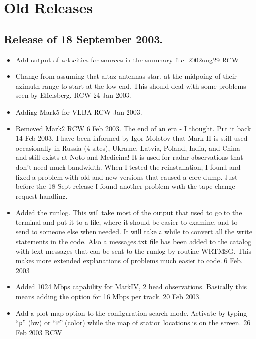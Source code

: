 \documentclass{report}
\begin{document}
\section{\label{SSEC:OLDRELEASE}Old Releases}


\subsection{\label{SSSEC:18SEP2003}Release of 18 September 2003.}

\begin{itemize}

\item  Add output of velocities for sources in the summary file.
2002aug29 RCW.

\item  Change from assuming that altaz antennas start at the midpoing
of their azimuth range to start at the low end.  This should deal
with some problems seen by Effelsberg.  RCW  24 Jan 2003.

\item  Adding Mark5 for VLBA  RCW Jan 2003.

\item Removed Mark2 RCW 6 Feb 2003.  The end of an era - I thought.
Put it back 14 Feb 2003.  I have been informed by Igor Molotov that
Mark II is still used occasionally in Russia (4 sites), Ukraine,
Latvia, Poland, India, and China and still exists at Noto and
Medicina!  It is used for radar observations that don't need much
bandwidth.  When I tested the reinstallation, I found and fixed a
problem with old and new versions that caused a core dump.
Just before the 18 Sept release I found another problem with the
tape change request handling.

\item  Added the runlog.  This will take most of the output that used
to go to the terminal and put it to a file, where it should be easier
to examine, and to send to someone else when needed.  It will take
a while to convert all the write statements in the code.  Also a
messages.txt file has been added to the catalog with text messages
that can be sent to the runlog by routine WRTMSG.  This makes more
extended explanations of problems much easier to code.  6 Feb. 2003

\item  Added 1024 Mbps capability for MarkIV, 2 head observations.
Basically this means adding the option for 16 Mbps per track.
20 Feb 2003.

\item  Add a plot map option to the configuration search mode.  Activate
by typing ``{\tt p}'' (bw) or ``{\tt P}'' (color) while the map
of station locations is on the screen.  26 Feb 2003  RCW


\end{itemize}
\end{document}
